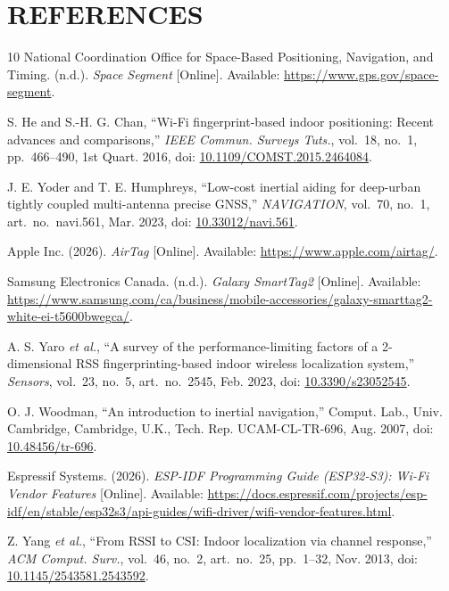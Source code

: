 \documentclass[12pt,letterpaper]{article}
\begin{document}
\section*{REFERENCES}
\begingroup
{}
\renewcommand{\section}[2]{}%
\begin{thebibliography}{10}
\setlength{\itemsep}{\baselineskip}
National Coordination Office for Space-Based Positioning, Navigation, and Timing. (n.d.).
\emph{Space Segment} [Online]. Available: \url{https://www.gps.gov/space-segment}.

S. He and S.-H. G. Chan, ``Wi-Fi fingerprint-based indoor positioning: Recent advances and
comparisons,'' \emph{IEEE Commun. Surveys Tuts.}, vol.~18, no.~1, pp.~466--490, 1st Quart. 2016,
doi: \url{10.1109/COMST.2015.2464084}.

J. E. Yoder and T. E. Humphreys, ``Low-cost inertial aiding for deep-urban tightly coupled
multi-antenna precise GNSS,'' \emph{NAVIGATION}, vol.~70, no.~1, art.~no.~navi.561, Mar. 2023,
doi: \url{10.33012/navi.561}.

Apple Inc. (2026). \emph{AirTag} [Online]. Available: \url{https://www.apple.com/airtag/}.

Samsung Electronics Canada. (n.d.). \emph{Galaxy SmartTag2} [Online]. Available:
\url{https://www.samsung.com/ca/business/mobile-accessories/galaxy-smarttag2-white-ei-t5600bwegca/}.

A. S. Yaro \emph{et al.}, ``A survey of the performance-limiting factors of a
2-dimensional RSS fingerprinting-based indoor wireless localization system,'' \emph{Sensors},
vol.~23, no.~5, art.~no.~2545, Feb. 2023, doi: \url{10.3390/s23052545}.

O. J. Woodman, ``An introduction to inertial navigation,'' Comput. Lab., Univ. Cambridge,
Cambridge, U.K., Tech. Rep. UCAM-CL-TR-696, Aug. 2007, doi: \url{10.48456/tr-696}.

Espressif Systems. (2026). \emph{ESP-IDF Programming Guide (ESP32-S3): Wi-Fi Vendor Features}
[Online]. Available:
\url{https://docs.espressif.com/projects/esp-idf/en/stable/esp32s3/api-guides/wifi-driver/wifi-vendor-features.html}.

Z. Yang \emph{et al.}, ``From RSSI to CSI: Indoor localization via channel response,''
\emph{ACM Comput. Surv.}, vol.~46, no.~2, art.~no.~25, pp.~1--32, Nov. 2013,
doi: \url{10.1145/2543581.2543592}.


\end{thebibliography}
\end{document}
